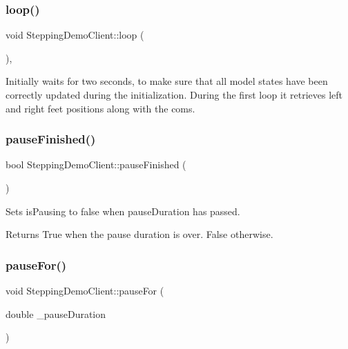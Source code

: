 \subsubsection{\texorpdfstring{loop()}{loop()}}
{\footnotesize\ttfamily void Stepping\+Demo\+Client\+::loop (\begin{DoxyParamCaption}{ }\end{DoxyParamCaption})\hspace{0.3cm}{\ttfamily [protected]}, {\ttfamily [virtual]}}

Initially waits for two seconds, to make sure that all model states have been correctly updated during the initialization. During the first loop it retrieves left and right feet positions along with the com\textquotesingle{}s. \hypertarget{classSteppingDemoClient_afe78b799d8b8c63cff7d1e8765b7e1fa}{}\label{classSteppingDemoClient_afe78b799d8b8c63cff7d1e8765b7e1fa} 
\subsubsection{\texorpdfstring{pause\+Finished()}{pauseFinished()}}
{\footnotesize\ttfamily bool Stepping\+Demo\+Client\+::pause\+Finished (\begin{DoxyParamCaption}{ }\end{DoxyParamCaption})\hspace{0.3cm}{\ttfamily [private]}}

Sets is\+Pausing to false when pause\+Duration has passed.

\begin{DoxyReturn}{Returns}
True when the pause duration is over. False otherwise. 
\end{DoxyReturn}
\hypertarget{classSteppingDemoClient_a6b5d8bf0ce08c8b9f66ac2c1bbd5bcd7}{}\label{classSteppingDemoClient_a6b5d8bf0ce08c8b9f66ac2c1bbd5bcd7} 
\subsubsection{\texorpdfstring{pause\+For()}{pauseFor()}}
{\footnotesize\ttfamily void Stepping\+Demo\+Client\+::pause\+For (\begin{DoxyParamCaption}\item[{double}]{\+\_\+pause\+Duration }\end{DoxyParamCaption})\hspace{0.3cm}{\ttfamily [private]}}

